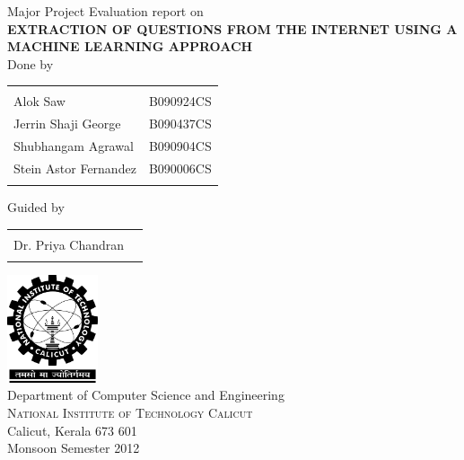 \documentclass[10pt,a4paper]{report}
\begin{document}
\renewcommand\bibname{References} %

\begin{titlepage}

\begin{center}

\textup{\large Major Project Evaluation report on}\\[1.0cm]

\uppercase{\Large \textbf {Extraction of Questions from the Internet using a Machine Learning approach}}\\[3.0cm]

\normalsize Done by \\
\begin{table}[h]
\centering
\begin{tabular}{lr}\hline \\
Alok Saw & B090924CS \\ 
Jerrin Shaji George & B090437CS \\ 
Shubhangam Agrawal & B090904CS \\ 
Stein Astor Fernandez & B090006CS \\ \\ \hline 

\end{tabular}
\end{table}

\normalsize Guided by \\ 
\begin{table}[h]
\centering
\begin{tabular}{lr}\hline \\
Dr. Priya Chandran \\ \\ \hline

\end{tabular}
\end{table}

\vfill

\includegraphics[width=0.20\textwidth]{./nitc-logo}\\[1cm]
\LARGE{Department of Computer Science and Engineering}\\
\normalsize
\textsc{National Institute of Technology Calicut}\\
Calicut, Kerala 673 601 \\
\vspace{0.5cm}
Monsoon Semester 2012

\end{center}

\end{titlepage}
\end{document}
